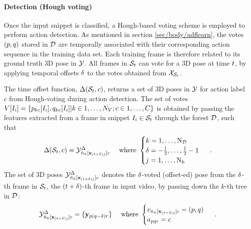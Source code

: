 \paragraph{Detection (Hough voting)}
Once the input snippet is classified, a Hough-based voting scheme is employed to perform action detection. 
As mentioned in section \ref{sec/body/adflearn}, the votes $(p,q)$ stored in $\mathcal{D}$ are temporally associated with their corresponding action sequence in the training data set. Each training frame is therefore related to its ground truth 3D pose in $\mathcal{Y}$. All frames in $\mathcal{S}_{t}$ can vote for a 3D pose at time $t$, by applying temporal offsets $\delta$ to the votes obtained from $\mathcal{X}_{\mathcal{S}_{t}}$. 

The time offset function, $\Delta(\mathcal{S}_{t},c)$, returns a set of 3D poses in $\mathcal{Y}$ for action label $c$ from Hough-voting during action detection. 
The set of votes $V[I_i] = \{ p_{k c}[I_{i}], q_{k c}[I_{i}]|k\in1,\dots,N_{V};c\in1,\dots,C\}$ is obtained by passing the features extracted from a frame in snippet $I_{i} \in \mathcal{S}_{t}$ through the forest $\mathcal{D}$, such that 
\begin{equation} 
	\begin{array}{lr}
		\Delta(\mathcal{S}_{t}, c) = \mathcal{Y}^{\Delta}_{{\hat{n}}_{k}[\mathbf{x}_{(t+\delta)j}]c}
		& \mbox{ where } 
		\begin{cases}
			k = 1,\dots,\mathrm{N_{\mathcal{D}}} \\ 
			\delta = -\frac{l}{2},\dots,\frac{l}{2}-1\\ 
			j = 1,\dots,\mathrm{N_{h}}  
		\end{cases}
	\end{array}.
\end{equation}
The set of 3D poses $\mathcal{Y}^{\Delta}_{{\hat{n}}_{k}[\mathbf{x}_{(t+\delta)j}]c}$ denotes the $\delta$-voted (offset-ed) pose from the $\delta$-th frame in $\mathcal{S}_{t}$, \ie the $(t + \delta)$-th frame in input video, by passing down the $k$-th tree in $\mathcal{D}$:
\begin{equation}
	\begin{array}{lr}
		\mathcal{Y}^{\Delta}_{{\hat{n}}_{k}[\mathbf{x}_{(t+\delta)j}]c} = \{\mathbf{y}_{p(q-\delta)r}\}
		& \mbox{ where }
		\begin{cases}
			v_{{\hat{n}}_{k}[\mathbf{x}_{(t+\delta)j}]c} = (p, q) \\ 
			a_{pqr} = c 
		\end{cases}
	\end{array}.
\end{equation} 
